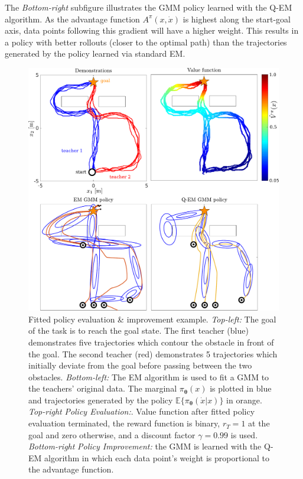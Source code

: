 \documentclass[final,5p,times,twocolumn]{elsarticle}
\newcommand{\X}{x}
\newcommand{\U}{\dot{x}}
\newcommand{\Param}{\boldsymbol{\theta}}
\begin{document}
The \textit{Bottom-right} subfigure illustrates the GMM policy learned with the Q-EM algorithm. As 
the advantage function $ A^{\pi}(\X,\U)$ is highest along the start-goal axis, data points
following this gradient will have a higher weight. This results in a policy with better 
rollouts (closer to the optimal path) than the trajectories generated by the policy learned via standard EM. 

\begin{figure}
 \centering
 \setlength\fboxsep{0pt}
  \setlength\fboxrule{0.25pt}
  \includegraphics[width=\linewidth]{./Figure/fpe_example.pdf}
 \caption{Fitted policy evaluation \& improvement example. 
  \textit{Top-left:} The goal of the task is to reach the goal state. The first teacher (blue) demonstrates 
  five trajectories which contour the obstacle in front of the goal. The second teacher (red) demonstrates 
  5 trajectories which initially deviate from the goal before passing between the two obstacles. 
  \textit{Bottom-left:} The EM algorithm is used to fit a GMM to the teachers' original data. 
  The marginal $\pi_{\Param}(\X)$ is plotted in blue and trajectories generated by the 
  policy $\mathbb{E}\{\pi_{\Param}(\U|\X)\}$ in orange. \textit{Top-right} \textit{Policy Evaluation:}.  
  Value function after fitted policy evaluation terminated, the reward function 
  is binary, $r_T=1$ at the goal and zero otherwise, and a discount factor $\gamma = 0.99$ is used.
  \textit{Bottom-right} \textit{Policy Improvement:} the GMM is learned with the Q-EM algorithm in which 
  each data point's weight is proportional to the advantage function.
 }
  \label{fig:fpe_example}
\end{figure}
\end{document}
